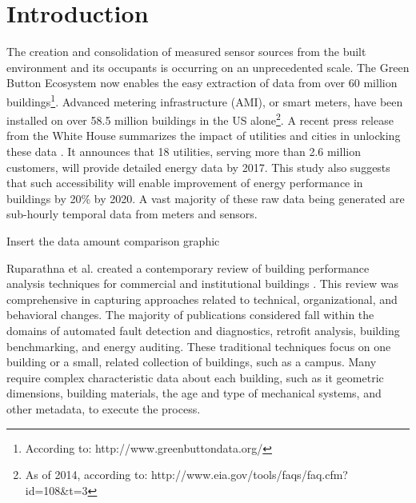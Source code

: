 \section{Introduction}

The creation and consolidation of measured sensor sources from the built environment and its occupants is occurring on an unprecedented scale. The Green Button Ecosystem now enables the easy extraction of data from over 60 million buildings\footnote{According to: http://www.greenbuttondata.org/}. Advanced metering infrastructure (AMI), or smart meters, have been installed on over 58.5 million buildings in the US alone\footnote{As of 2014, according to: http://www.eia.gov/tools/faqs/faq.cfm?id=108&t=3}. A recent press release from the White House summarizes the impact of utilities and cities in unlocking these data \cite{the_white_house_fact_2016}. It announces that 18 utilities, serving more than 2.6 million customers, will provide detailed energy data by 2017. This study also suggests that such accessibility will enable improvement of energy performance in buildings by 20\% by 2020. A vast majority of these raw data being generated are sub-hourly temporal data from meters and sensors. 

Insert the data amount comparison graphic

Ruparathna et al. created a contemporary review of building performance analysis techniques for commercial and institutional buildings \cite{ruparathna_improving_2016}. This review was comprehensive in capturing approaches related to technical, organizational, and behavioral changes. The majority of publications considered fall within the domains of automated fault detection and diagnostics, retrofit analysis, building benchmarking, and energy auditing. These traditional techniques focus on one building or a small, related collection of buildings, such as a campus. Many require complex characteristic data about each building, such as it geometric dimensions, building materials, the age and type of mechanical systems, and other metadata, to execute the process. 

